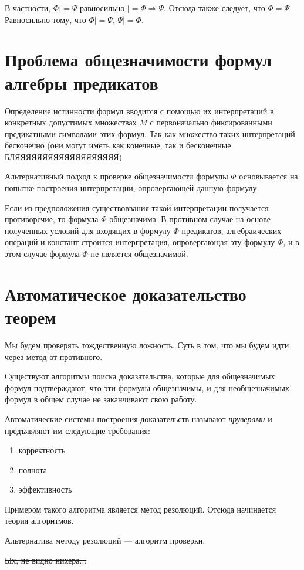 \documentclass{article}
\begin{document}
В частности, $\Phi |= \Psi$ равносильно $|= \Phi \Rightarrow \Psi$. Отсюда также следует, что $\Phi = \Psi$ Равносильно тому, что $\Phi |= \Psi$, $\Psi |= \Phi$.

\section{Проблема общезначимости формул алгебры предикатов}
Определение истинности формул вводится с помощью их интерпретаций в конкретных допустимых множествах $M$ с первоначально фиксированными предикатными символами этих формул. Так как множество таких интерпретаций бесконечно (они могут иметь как конечные, так и бесконечные БЛЯЯЯЯЯЯЯЯЯЯЯЯЯЯЯЯЯЯЯ)

Альтернативный подход к проверке общезначимости формулы $\Phi$ основывается на попытке построения интерпретации, опровергающей данную формулу.

Если из предположения существоввания такой интерпретации получается противоречие, то формула $\Phi$ общезначима. В противном случае на основе полученных условий для входящих в формулу $\Phi$ предикатов, алгебраических операций и констант строится интерпретация, опровергающая эту формулу $\Phi$, и в этом случае формула $\Phi$ не является общезначимой.

\section{Автоматическое доказательство теорем}
Мы будем проверять тождественную ложность. Суть в том, что мы будем идти через метод от противного.

Существуют алгоритмы поиска доказательства, которые для общезначимых формул подтверждают, что эти формулы общезначимы, и для необщезначимых формул в общем случае не заканчивают свою работу.

Автоматические системы построения доказательств называют {\it пруверами} и предъявляют им следующие требования:
\begin{enumerate}
    \item корректность
    \item полнота 
    \item эффективность
\end{enumerate}

Примером такого алгоритма является метод резолюций. Отсюда начинается теория алгоритмов.

Альтернатива методу резолюций --- алгоритм проверки.

\sout{Ых, не видно нихера...}
\end{document}
